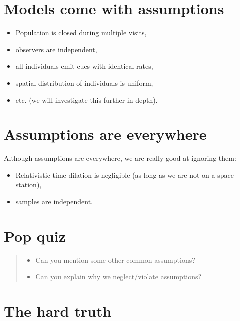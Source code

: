 \documentclass[12pt,]{book}
\providecommand{\tightlist}{%
  \setlength{\itemsep}{0pt}\setlength{\parskip}{0pt}}
\begin{document}
\hypertarget{models-come-with-assumptions}{%
\section{Models come with assumptions}\label{models-come-with-assumptions}}

\begin{itemize}
\tightlist
\item
  Population is closed during multiple visits,
\item
  observers are independent,
\item
  all individuals emit cues with identical rates,
\item
  spatial distribution of individuals is uniform,
\item
  etc. (we will investigate this further in depth).
\end{itemize}

\hypertarget{assumptions-are-everywhere}{%
\section{Assumptions are everywhere}\label{assumptions-are-everywhere}}

Although assumptions are everywhere, we are really good at ignoring them:

\begin{itemize}
\tightlist
\item
  Relativistic time dilation is negligible (as long as we are not on a space station),
\item
  samples are independent.
\end{itemize}

\hypertarget{pop-quiz-1}{%
\section{Pop quiz}\label{pop-quiz-1}}

\begin{quote}
\begin{itemize}
\tightlist
\item
  Can you mention some other common assumptions?
\item
  Can you explain why we neglect/violate assumptions?
\end{itemize}
\end{quote}

\hypertarget{the-hard-truth}{%
\section{The hard truth}\label{the-hard-truth}}
\end{document}
